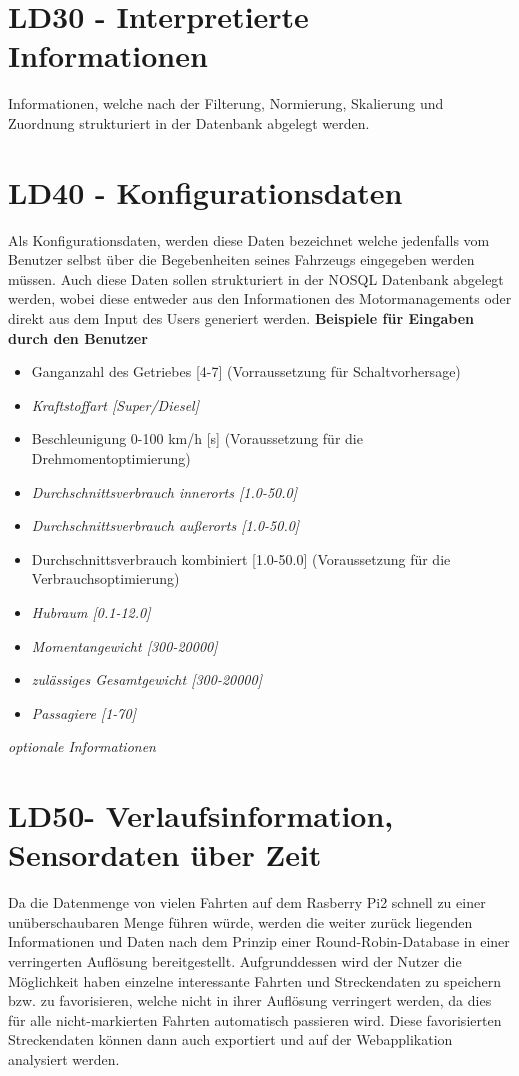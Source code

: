 \section{LD30 - Interpretierte Informationen}
Informationen, welche nach der Filterung, Normierung, Skalierung und Zuordnung strukturiert in der Datenbank abgelegt werden.

\section{LD40 - Konfigurationsdaten}
Als Konfigurationsdaten, werden diese Daten bezeichnet welche jedenfalls vom Benutzer selbst über die Begebenheiten seines Fahrzeugs eingegeben werden müssen. Auch diese Daten sollen strukturiert in der NOSQL Datenbank abgelegt werden, wobei diese entweder aus den Informationen des Motormanagements oder direkt aus dem Input des Users generiert werden.
\textbf{Beispiele für Eingaben durch den Benutzer}
\begin{itemize}
	\item Ganganzahl des Getriebes [4-7] (Vorraussetzung für Schaltvorhersage)
	\item \textit{Kraftstoffart [Super/Diesel]}
	\item Beschleunigung 0-100 km/h [s] (Voraussetzung für die Drehmomentoptimierung)
	\item \textit{Durchschnittsverbrauch innerorts [1.0-50.0]} 
	\item \textit{Durchschnittsverbrauch außerorts [1.0-50.0]}	
	\item Durchschnittsverbrauch kombiniert [1.0-50.0] (Voraussetzung für die Verbrauchsoptimierung)
	\item \textit{Hubraum [0.1-12.0]}
	\item \textit{Momentangewicht [300-20000]}
	\item \textit{zulässiges Gesamtgewicht [300-20000]}
	\item \textit{Passagiere [1-70]}
\end{itemize}
\textit{optionale Informationen}

\section{LD50- Verlaufsinformation, Sensordaten über Zeit}
Da die Datenmenge von vielen Fahrten auf dem Rasberry Pi2 schnell zu einer unüberschaubaren Menge führen würde, werden die weiter zurück liegenden Informationen und Daten nach dem Prinzip einer Round-Robin-Database in einer verringerten Auflösung bereitgestellt. 
Aufgrunddessen wird der Nutzer die Möglichkeit haben einzelne interessante Fahrten und Streckendaten zu speichern bzw. zu favorisieren, welche nicht in ihrer Auflösung verringert werden, da dies für alle nicht-markierten Fahrten automatisch passieren wird. Diese favorisierten Streckendaten können dann auch exportiert und auf der Webapplikation analysiert werden.